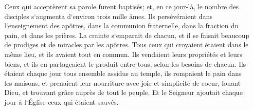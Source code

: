 \verse Ceux qui acceptèrent sa parole furent baptisés; et, en ce jour-là, le nombre des disciples s`augmenta d`environ trois mille âmes. 
\verse Ils persévéraient dans l`enseignement des apôtres, dans la communion fraternelle, dans la fraction du pain, et dans les prières. 
\verse La crainte s`emparait de chacun, et il se faisait beaucoup de prodiges et de miracles par les apôtres. 
\verse Tous ceux qui croyaient étaient dans le même lieu, et ils avaient tout en commun. 
\verse Ils vendaient leurs propriétés et leurs biens, et ils en partageaient le produit entre tous, selon les besoins de chacun. 
\verse Ils étaient chaque jour tous ensemble assidus au temple, ils rompaient le pain dans les maisons, et prenaient leur nourriture avec joie et simplicité de coeur, 
\verse louant Dieu, et trouvant grâce auprès de tout le peuple. Et le Seigneur ajoutait chaque jour à l`Église ceux qui étaient sauvés. 

\chapter{}

